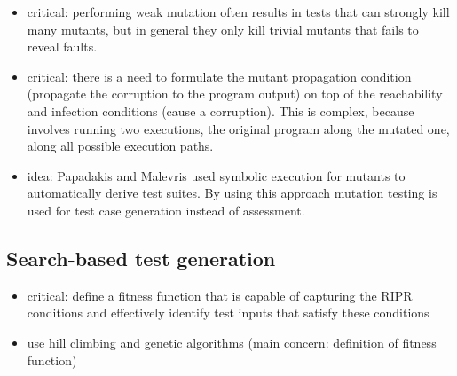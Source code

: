 \begin{itemize}
	\item critical: performing weak mutation often results in tests that can strongly kill many mutants, but in general they only kill trivial mutants that fails to reveal faults.
	
	\item critical: there is a need to formulate the mutant propagation condition (propagate the corruption to the program output) on top of the reachability and infection conditions (cause a corruption). This is complex, because involves running two executions, the original program along the mutated one, along all possible execution paths.

	\item idea: Papadakis and Malevris \cite{papadakis2010automatic} used symbolic execution for mutants to automatically derive test suites. By using this approach mutation testing is used for test case generation instead of assessment.

\end{itemize}

\subsection{Search-based test generation} %
\label{sub:search_based_test_generation}

\begin{itemize}
	\item critical: define a fitness function that is capable of capturing the RIPR conditions and effectively identify test inputs that satisfy these conditions
	\item use hill climbing and genetic algorithms (main concern: definition of fitness function) 
\end{itemize}

